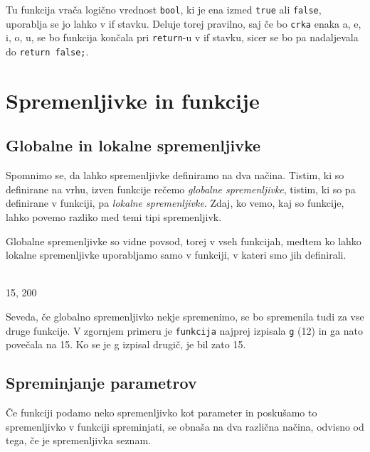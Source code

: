 Tu funkcija vrača logično vrednost \verb+bool+, ki je ena izmed \verb+true+ ali
\verb+false+, uporablja se jo lahko v if stavku. Deluje torej pravilno, saj če
bo \verb+crka+ enaka a, e, i, o, u, se bo funkcija končala pri \verb+return+-u
v if stavku, sicer se bo pa nadaljevala do \verb+return false;+.


\section{Spremenljivke in funkcije}

\subsection{Globalne in lokalne spremenljivke}

Spomnimo se, da lahko spremenljivke definiramo na dva načina. Tistim, ki so
definirane na vrhu, izven funkcije rečemo \emph{globalne spremenljivke},
tistim, ki so pa definirane v funkciji, pa \emph{lokalne spremenljivke}. Zdaj,
ko vemo, kaj so funkcije, lahko povemo razliko med temi tipi spremenljivk.

Globalne spremenljivke so vidne povsod, torej v vseh funkcijah, medtem ko lahko
lokalne spremenljivke uporabljamo samo v funkciji, v kateri smo jih definirali.

\begin{examples}

    \begin{inout}
         \\
        15, 200
    \end{inout}

\end{examples}

Seveda, če globalno spremenljivko nekje spremenimo, se bo spremenila tudi za
vse druge funkcije. V zgornjem primeru je \verb+funkcija+ najprej izpisala
\verb+g+ (12) in ga nato povečala na 15. Ko se je g izpisal drugič, je bil zato
15.

\subsection{Spreminjanje parametrov}

Če funkciji podamo neko spremenljivko kot
parameter in poskušamo to spremenljivko v funkciji spreminjati, se obnaša na
dva različna načina, odvisno od tega, če je spremenljivka seznam.

